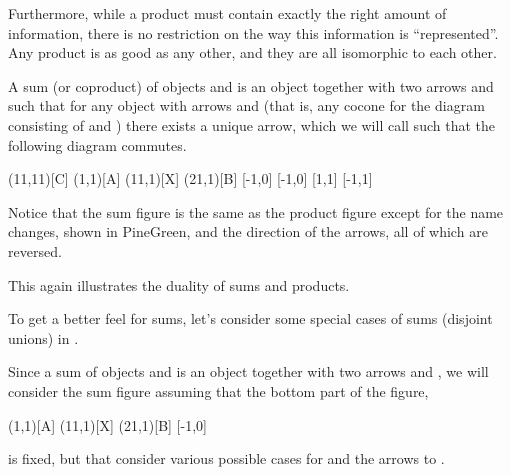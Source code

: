 \documentclass{seminar}
\begin{document}
\begin{slide}
Furthermore, while a product must contain exactly the right amount
of information, there is no restriction on the way this information
is ``represented''.  Any product is as good as any other, and
they are all isomorphic to each other.

\newpage

A sum (or coproduct) of objects  and  is an object 
together with two arrows  and
such that for any object  with arrows  and
(that is, any cocone for the diagram consisting of  and )
there exists a unique arrow, which we will call
\tm{[a,b]} such that the following diagram commutes.

\begin{cdiag}
\obj(11,11)[C]{}
\obj(1,1)[A]{}
\obj(11,1)[X]{}
\obj(21,1)[B]{}
[-1,0]
[-1,0]
[1,1]
[-1,1]
\end{cdiag}

\newslide

Notice that the sum figure is the same as the product figure except
for the name changes, shown in \textcolor{OtherColor}{PineGreen},
and the direction of the arrows, all of which are reversed.

This again illustrates the duality of sums and products.

\newslide

To get a better feel for sums,
let's consider some special cases of sums (disjoint unions) in .

Since a sum of objects  and  is an object 
together with two arrows  and
, we will consider the sum figure
assuming that the bottom part of the figure,

\begin{cdiag}
\obj(1,1)[A]{}
\obj(11,1)[X]{}
\obj(21,1)[B]{}
[-1,0]
\end{cdiag}

is fixed, but that
consider various possible cases for  and the arrows to .


\end{slide}
\end{document}
